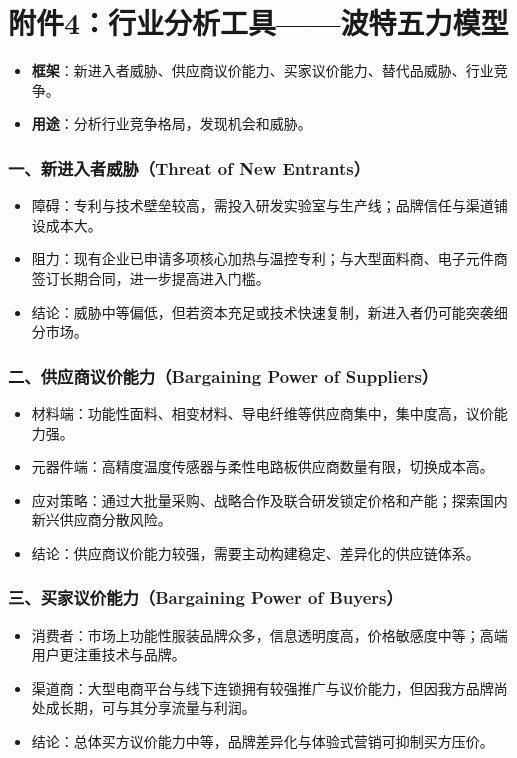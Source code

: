 \documentclass[UTF8]{report}
\theoremstyle{MyLineTheoremStyle} %
\theoremstyle{MyBlockTheoremStyle} %
\theoremstyle{MySubsubsectionStyle} %
\begin{document}
\section{附件4：行业分析工具——波特五力模型}
\begin{itemize}
    \item \textbf{框架}：新进入者威胁、供应商议价能力、买家议价能力、替代品威胁、行业竞争。
    \item \textbf{用途}：分析行业竞争格局，发现机会和威胁。
\end{itemize}

  \subsubsection{一、新进入者威胁（Threat of New Entrants）}
    \begin{itemize}
      \item 障碍：专利与技术壁垒较高，需投入研发实验室与生产线；品牌信任与渠道铺设成本大。  
      \item 阻力：现有企业已申请多项核心加热与温控专利；与大型面料商、电子元件商签订长期合同，进一步提高进入门槛。  
      \item 结论：威胁中等偏低，但若资本充足或技术快速复制，新进入者仍可能突袭细分市场。
    \end{itemize}

  \subsubsection{二、供应商议价能力（Bargaining Power of Suppliers）}
    \begin{itemize}
      \item 材料端：功能性面料、相变材料、导电纤维等供应商集中，集中度高，议价能力强。  
      \item 元器件端：高精度温度传感器与柔性电路板供应商数量有限，切换成本高。  
      \item 应对策略：通过大批量采购、战略合作及联合研发锁定价格和产能；探索国内新兴供应商分散风险。  
      \item 结论：供应商议价能力较强，需要主动构建稳定、差异化的供应链体系。
    \end{itemize}

  \subsubsection{三、买家议价能力（Bargaining Power of Buyers）}
    \begin{itemize}
      \item 消费者：市场上功能性服装品牌众多，信息透明度高，价格敏感度中等；高端用户更注重技术与品牌。  
      \item 渠道商：大型电商平台与线下连锁拥有较强推广与议价能力，但因我方品牌尚处成长期，可与其分享流量与利润。  
      \item 结论：总体买方议价能力中等，品牌差异化与体验式营销可抑制买方压价。
    \end{itemize}
\end{document}
